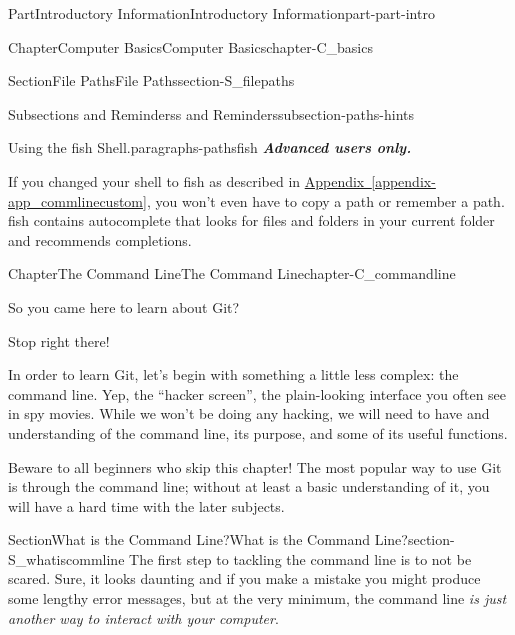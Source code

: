 \documentclass[oneside,10pt,]{book}
\newcommand{\xreffont}{\relax}
\newcommand{\alert}[1]{\textbf{\textit{#1}}}
\begin{document}
\begin{partptx}{Part}{Introductory Information}{}{Introductory Information}{}{}{part-part-intro}
\begin{chapterptx}{Chapter}{Computer Basics}{}{Computer Basics}{}{}{chapter-C_basics}
\begin{sectionptx}{Section}{File Paths}{}{File Paths}{}{}{section-S_filepaths}
\begin{subsectionptx}{Subsection}{s and Reminders}{}{s and Reminders}{}{}{subsection-paths-hints}
\begin{paragraphs}{Using the fish Shell.}{paragraphs-pathsfish}
%
\alert{Advanced users only.}%
\par
If you changed your shell to fish as described in \hyperref[appendix-app_commlinecustom]{Appendix~{\xreffont\ref{appendix-app_commlinecustom}}}, you won't even have to copy a path or remember a path. fish contains autocomplete that looks for files and folders in your current folder and recommends completions.%
\end{paragraphs}%
\end{subsectionptx}
\end{sectionptx}
\end{chapterptx}
%
\typeout{************************************************}
\typeout{************************************************}
%
\begin{chapterptx}{Chapter}{The Command Line}{}{The Command Line}{}{}{chapter-C_commandline}
\renewcommand*{\chaptername}{Chapter}
\begin{introduction}{}%
So you came here to learn about Git?%
\par
Stop right there!%
\par
In order to learn Git, let's begin with something a little less complex: the command line. Yep, the ``hacker screen'', the plain-looking interface you often see in spy movies. While we won't be doing any hacking, we will need to have and understanding of the command line, its purpose, and some of its useful functions.%
\par
Beware to all beginners who skip this chapter! The most popular way to use Git is through the command line; without at least a basic understanding of it, you will have a hard time with the later subjects.%
\end{introduction}%
%
%
\typeout{************************************************}
\typeout{************************************************}
%
\begin{sectionptx}{Section}{What is the Command Line?}{}{What is the Command Line?}{}{}{section-S_whatiscommline}
%
%
%
%
%
The first step to tackling the command line is to not be scared. Sure, it looks daunting and if you make a mistake you might produce some lengthy error messages, but at the very minimum, the command line \emph{is just another way to interact with your computer}.%
\par

\end{sectionptx}
\end{chapterptx}
\end{partptx}
\end{document}
